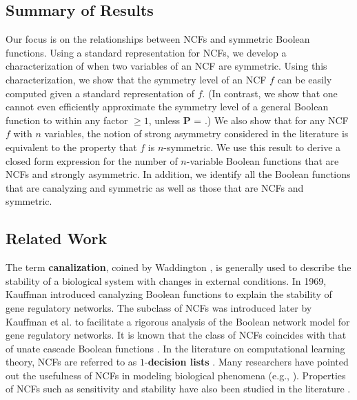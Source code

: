 
\subsection{Summary of Results}
\label{sse:contrib}

Our focus is on the relationships between 
NCFs and symmetric Boolean functions.
Using a standard representation for NCFs, we develop a
characterization of when two variables of an NCF are symmetric.
Using this characterization, we show
that the symmetry level of an NCF $f$
can be easily computed given a standard representation of $f$.
(In contrast, we show that 
one cannot even efficiently approximate the symmetry level of
a general Boolean function to within any factor $\geq 1$, 
unless \textbf{P} = \cnp.)
We also show that for any NCF $f$ with $n$ variables, the notion of
strong asymmetry considered in the literature is equivalent to
the property that $f$ is $n$-symmetric.
We use this result to derive a closed form expression for the
number of $n$-variable Boolean functions
that are NCFs and strongly asymmetric.
In addition, we identify all the Boolean functions that are 
canalyzing and symmetric as well as those that 
are NCFs and symmetric.

\subsection{Related Work}
\label{sse:related}

The term \textbf{canalization}, coined by
Waddington \cite{Waddington-1942}, is generally used to describe
the stability of a biological system with changes
in external conditions.
In 1969, Kauffman \cite{Kauffman-1969} introduced canalyzing Boolean functions
to explain the stability of gene regulatory networks.
The subclass of NCFs was
introduced later by Kauffman et al. \cite{Kauffman-etal-2003} 
to facilitate a rigorous analysis of the Boolean network model
for gene regulatory networks.
It is known that the class of NCFs coincides with that
of unate cascade Boolean functions \cite{Jarrah-etal-2007}.
In the literature on computational learning theory,
NCFs are referred to as $1$-\textbf{decision lists} \cite{KV-1994}.
Many researchers have pointed out the usefulness of NCFs 
in modeling biological phenomena 
(e.g., \cite{Layne-2011,
Layne-etal-2012,Li-etal-2011,Li-etal-2012,Li-etal-2013}).
Properties of NCFs such as sensitivity and 
stability have also been studied in the 
literature \cite{Kauffman-etal-2004, Layne-2011,Layne-etal-2012,
Li-etal-2011,Li-etal-2013,Klotz-etal-2013, Stearns-etal-2018}. 

